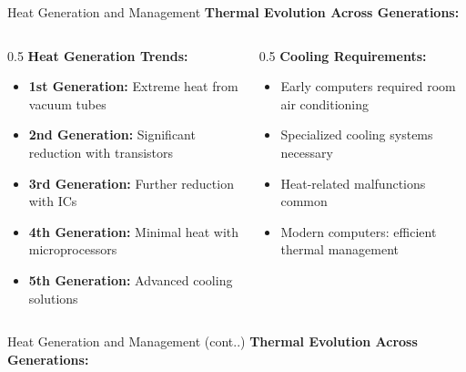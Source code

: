 \documentclass[aspectratio=169]{beamer}
\begin{document}
\begin{frame}{Heat Generation and Management}
    \textbf{Thermal Evolution Across Generations:}
    
    \begin{columns}
        \begin{column}{0.5\textwidth}
            \textbf{Heat Generation Trends:}
            \begin{itemize}
                \item \textbf{1st Generation:} Extreme heat from vacuum tubes
                \item \textbf{2nd Generation:} Significant reduction with transistors
                \item \textbf{3rd Generation:} Further reduction with ICs
                \item \textbf{4th Generation:} Minimal heat with microprocessors
                \item \textbf{5th Generation:} Advanced cooling solutions
            \end{itemize}
        \end{column}
        \begin{column}{0.5\textwidth}
            \textbf{Cooling Requirements:}
            \begin{itemize}
                \item Early computers required room air conditioning
                \item Specialized cooling systems necessary
                \item Heat-related malfunctions common
                \item Modern computers: efficient thermal management
            \end{itemize}
        \end{column}
    \end{columns}
     
\end{frame}

\begin{frame}{Heat Generation and Management (cont..)}
    \textbf{Thermal Evolution Across Generations:}
     
    \begin{center}
    \end{center}
\end{frame}
\end{document}

